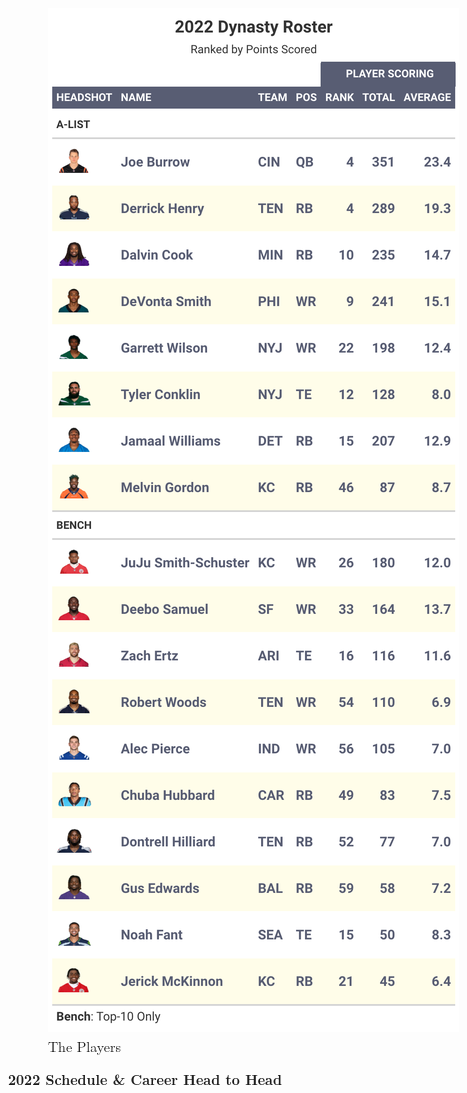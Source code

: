 \documentclass[
]{article}
\begin{document}
\begin{figure}
\includegraphics[width=0.75\linewidth,height=0.75\textheight]{output/2022/dynasty_roster_Pdpablo} \caption{The Players}\label{fig:unnamed-chunk-36}
\end{figure}
\newpage

\textbf{2022 Schedule \& Career Head to Head}
\end{document}
